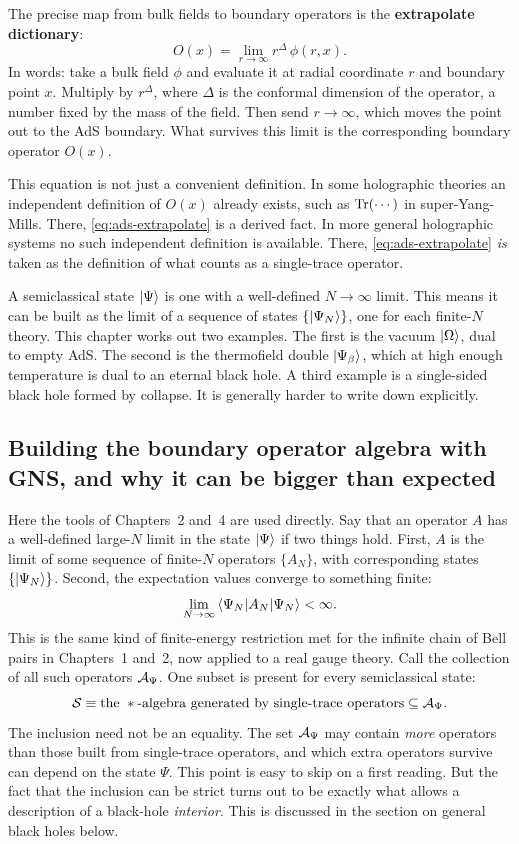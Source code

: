 The precise map from bulk fields to boundary operators is the \textbf{extrapolate dictionary}:
\begin{equation}
O(x) = \lim_{r\to\infty} r^\Delta\,\phi(r,x) .
\label{eq:ads-extrapolate}
\end{equation}
In words: take a bulk field $\phi$ and evaluate it at radial coordinate $r$ and boundary point $x$. Multiply by
$r^\Delta$, where $\Delta$ is the conformal dimension of the operator, a number fixed by the mass of the field.
Then send $r\to\infty$, which moves the point out to the AdS boundary. What survives this limit is the
corresponding boundary operator $O(x)$.

This equation is not just a convenient definition. In some holographic theories an independent definition of
$O(x)$ already exists, such as $\operatorname{Tr}(\cdots)$ in super-Yang-Mills. There, \eqref{eq:ads-extrapolate} is a derived
fact. In more general holographic systems no such independent definition is available. There,
\eqref{eq:ads-extrapolate} \emph{is} taken as the definition of what counts as a single-trace operator.

A semiclassical state $\ket\Psi$ is one with a well-defined $N\to\infty$ limit. This means it can be built as
the limit of a sequence of states $\{\ket{\Psi_N}\}$, one for each finite-$N$ theory. This chapter works out two
examples. The first is the vacuum $\ket\Omega$, dual to empty AdS. The second is the thermofield double
$\ket{\Psi_\beta}$, which at high enough temperature is dual to an eternal black hole. A third example is a
single-sided black hole formed by collapse. It is generally harder to write down explicitly.

\subsection*{Building the boundary operator algebra with GNS, and why it can be bigger than expected}

Here the tools of Chapters~2 and~4 are used directly. Say that an operator $A$ has a well-defined large-$N$
limit in the state $\ket\Psi$ if two things hold. First, $A$ is the limit of some sequence of finite-$N$
operators $\{A_N\}$, with corresponding states $\{\ket{\Psi_N}\}$. Second, the expectation values converge to
something finite:
\[
\lim_{N\to\infty}\braket{\Psi_N|A_N|\Psi_N}<\infty .
\]
This is the same kind of finite-energy restriction met for the infinite chain of Bell pairs in Chapters~1
and~2, now applied to a real gauge theory. Call the collection of all such operators $\mathcal{A}_\Psi$. One subset is
present for every semiclassical state:
\[
\mathcal{S} \equiv \text{the } *\text{-algebra generated by single-trace operators} \subseteq \mathcal{A}_\Psi .
\]
The inclusion need not be an equality. The set $\mathcal{A}_\Psi$ may contain \emph{more} operators than those built
from single-trace operators, and which extra operators survive can depend on the state $\Psi$. This point is
easy to skip on a first reading. But the fact that the inclusion can be strict turns out to be exactly what
allows a description of a black-hole \emph{interior}. This is discussed in the section on general black holes
below.

